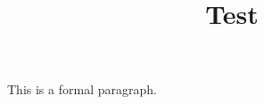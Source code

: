 \documentclass{homework}
\title{Test}
\begin{document}
\maketitle




This is a formal paragraph.
    
\end{document}
